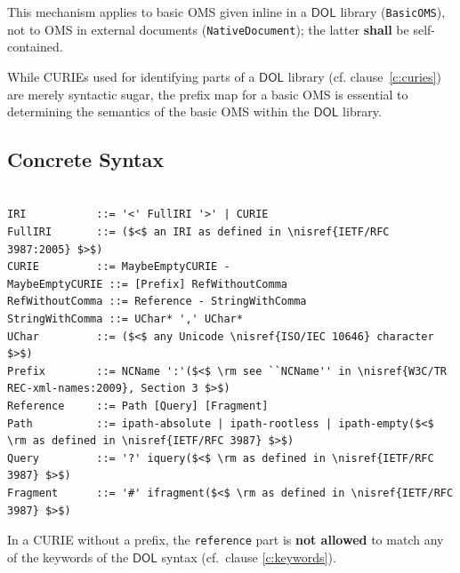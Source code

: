 \documentclass[10pt,fleqn,final]{scrreprt}
\makeatletter
\newcommand*{\cf}{cf.\@\xspace}
\newcommand*{\eg}{e.g.\@\xspace}
\newcommand*\CommentAuthor{}
\renewcommand*\CommentAuthor{#1}}
\newcommand*\CommentDate{}
\renewcommand*\CommentDate{#1}}
\newcommand*\CommentId{}
\renewcommand*\CommentId{#1}}
\newcommand*\CommentType{}
\renewcommand*\CommentType{#1}}
\newcommand*{\SetCommentColorByType}[1]{%
\edef\localType{{#1}}%
\expandafter\ifstrequal\localType{q-aut}{\colorlet{CommentColor}{red}}{%
\expandafter\ifstrequal\localType{q-all}{\colorlet{CommentColor}{orange}}{%
\expandafter\ifstrequal\localType{todo}{\colorlet{CommentColor}{orange}}{%
\expandafter\ifstrequal\localType{fyi}{\colorlet{CommentColor}{lightgray}}{%
\colorlet{CommentColor}{yellow}}}}}}
\newcommand*{\SetCommentPrefixByType}[1]{%
\edef\localType{{#1}}%
\expandafter\@ifmtarg\localType{%
\edef\CommentPrefix{}%
}{%
\caseupper[q]{#1}%
\edef\CommentPrefix{\thestring: }%
}}
\newcommand*{\initComment}[1]{%
\setkeys{Comment}{#1}%
\SetCommentColorByType{\CommentType}%
\relax%
\SetCommentPrefixByType{\CommentType}%
\relax%
}
\newcommand*{\todonote}[2][]{%
\initComment{#1}%
\pdfcomment[author=\CommentAuthor,color=CommentColor,date=\CommentDate,id=\CommentId]{%
\CommentPrefix
#2}}
\renewcommand*{\todonote}[2][]{%
\initComment{#1}%
\ednote{\CommentPrefix #2}}
\newcommand*{\syntax}[1]{\texttt{#1}}
\newcommand*{\notallowed}{\textbf{not allowed}\xspace}
\newcommand*{\shall}{\textbf{shall}\xspace}
\newcommand*{\DOL}{\ensuremath{\mathsf{DOL}}\xspace}
\newcommand{\clauserefname}{clause}
\newcommand{\cref}[1]{\clauserefname~\ref{#1}}
\newcommand{\sclause}[1]{\section{#1}}
\newcommand{\ssclause}[1]{\subsection{#1}}
\newcommand{\nisref}[1]{#1}
\newenvironment{definitions}[0]{\medskip }{}
\makeatother
\begin{document}
\begin{definitions}
This mechanism applies to basic OMS given inline in a \DOL library (\syntax{BasicOMS}), not to OMS in external documents (\syntax{NativeDocument}); the latter \shall be self-contained.

While CURIEs used for identifying parts of a \DOL library (\cf \cref{c:curies}) are merely syntactic 
sugar, the prefix map for a basic OMS is essential to determining the semantics of the basic OMS 
within the \DOL library. 




\ssclause{Concrete Syntax}

\vspace{-1.4em}
\begin{lstlisting}[language=ebnf,escapeinside={()}]

IRI           ::= '<' FullIRI '>' | CURIE
FullIRI       ::= ($<$ an IRI as defined in \nisref{IETF/RFC 3987:2005} $>$) 
CURIE         ::= MaybeEmptyCURIE -
MaybeEmptyCURIE ::= [Prefix] RefWithoutComma
RefWithoutComma ::= Reference - StringWithComma
StringWithComma ::= UChar* ',' UChar*
UChar         ::= ($<$ any Unicode \nisref{ISO/IEC 10646} character $>$) 
Prefix        ::= NCName ':'($<$ \rm see ``NCName'' in \nisref{W3C/TR REC-xml-names:2009}, Section 3 $>$)
Reference     ::= Path [Query] [Fragment]
Path          ::= ipath-absolute | ipath-rootless | ipath-empty($<$ \rm as defined in \nisref{IETF/RFC 3987} $>$)
Query         ::= '?' iquery($<$ \rm as defined in \nisref{IETF/RFC 3987} $>$)
Fragment      ::= '#' ifragment($<$ \rm as defined in \nisref{IETF/RFC 3987} $>$)
\end{lstlisting}


In a CURIE without a prefix, the \syntax{reference} part is \notallowed to match any of the keywords of the \DOL syntax (cf.\ clause \ref{c:keywords}).

\medspace










\end{definitions}
\end{document}

